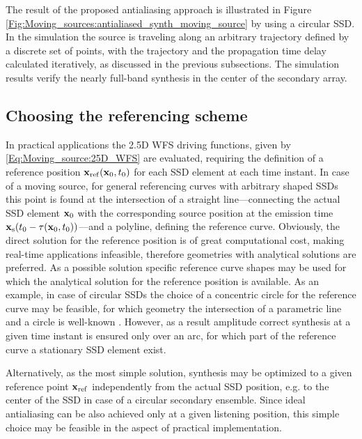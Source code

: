 The result of the proposed antialiasing approach is illustrated in Figure \ref{Fig:Moving_sources:antialiased_synth_moving_source} by using a circular SSD.
In the simulation the source is traveling along an arbitrary trajectory defined by a discrete set of points, with the trajectory and the propagation time delay calculated iteratively, as discussed in the previous subsections.
The simulation results verify the nearly full-band synthesis in the center of the secondary array.

\subsection{Choosing the referencing scheme}
In practical applications the 2.5D WFS driving functions, given by \eqref{Eq:Moving_source:25D_WFS} are evaluated, requiring the definition of a reference position $\mathbf{x}_{\mathrm{ref}}(\mathbf{x}_0,t_0)$ for each SSD element at each time instant.
In case of a moving source, for general referencing curves with arbitrary shaped SSDs this point is found at the intersection of a straight line---connecting the actual SSD element $\mathbf{x}_0$ with the corresponding source position at the emission time $\mathbf{x}_{\mathrm{s}}(t_0-\tau(\mathbf{x}_0,t_0))$---and a polyline, defining the reference curve. 
Obviously, the direct solution for the reference position is of great computational cost, making real-time applications infeasible, therefore geometries with analytical solutions are preferred.
As a possible solution specific reference curve shapes may be used for which the analytical solution for the reference position is available.
As an example, in case of circular SSDs the choice of a concentric circle for the reference curve may be feasible, for which geometry the intersection of a parametric line and a circle is well-known \cite[Ch.7.3.2]{Schneider2003:ComputerGraphics}.
However, as a result amplitude correct synthesis at a given time instant is ensured only over an arc, for which part of the reference curve a stationary SSD element exist.

Alternatively, as the most simple solution, synthesis may be optimized to a given reference point $\mathbf{x}_{\mathrm{ref}}$ independently from the actual SSD position, e.g. to the center of the SSD in case of a circular secondary ensemble.
Since ideal antialiasing can be also achieved only at a given listening position, this simple choice may be feasible in the aspect of practical implementation.

